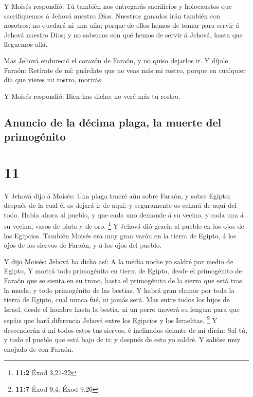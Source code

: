  Y Moisés respondió: Tú también nos entregarás
sacrificios y holocaustos que sacrifiquemos á Jehová nuestro Dios.
 Nuestros ganados irán también con nosotros; no quedará
ni una uña; porque de ellos hemos de tomar para servir á Jehová nuestro
Dios; y no sabemos con qué hemos de servir á Jehová, hasta que lleguemos
allá.

 Mas Jehová endureció el corazón de Faraón, y no quiso
dejarlos ir.  Y díjole Faraón: Retírate de mí: guárdate
que no veas más mi rostro, porque en cualquier día que vieres mi rostro,
morirás.

 Y Moisés respondió: Bien has dicho; no veré más tu
rostro.

\hypertarget{anuncio-de-la-duxe9cima-plaga-la-muerte-del-primoguxe9nito}{%
\subsection{Anuncio de la décima plaga, la muerte del
primogénito}\label{anuncio-de-la-duxe9cima-plaga-la-muerte-del-primoguxe9nito}}

\hypertarget{section-10}{%
\section{11}\label{section-10}}

 Y Jehová dijo á Moisés: Una plaga traeré aún sobre
Faraón, y sobre Egipto; después de la cual él os dejará ir de aquí; y
seguramente os echará de aquí del todo.  Habla ahora al
pueblo, y que cada uno demande á su vecino, y cada una á su vecina,
vasos de plata y de oro. \footnote{\textbf{11:2} Éxod 3,21-22}
 Y Jehová dió gracia al pueblo en los ojos de los
Egipcios. También Moisés era muy gran varón en la tierra de Egipto, á
los ojos de los siervos de Faraón, y á los ojos del pueblo.

 Y dijo Moisés: Jehová ha dicho así: A la media noche yo
saldré por medio de Egipto,  Y morirá todo primogénito en
tierra de Egipto, desde el primogénito de Faraón que se sienta en su
trono, hasta el primogénito de la sierva que está tras la muela; y todo
primogénito de las bestias.  Y habrá gran clamor por toda
la tierra de Egipto, cual nunca fué, ni jamás será.  Mas
entre todos los hijos de Israel, desde el hombre hasta la bestia, ni un
perro moverá su lengua: para que sepáis que hará diferencia Jehová entre
los Egipcios y los Israelitas. \footnote{\textbf{11:7} Éxod 9,4; Éxod
  9,26}  Y descenderán á mí todos estos tus siervos, é
inclinados delante de mí dirán: Sal tú, y todo el pueblo que está bajo
de ti; y después de esto yo saldré. Y salióse muy enojado de con Faraón.

